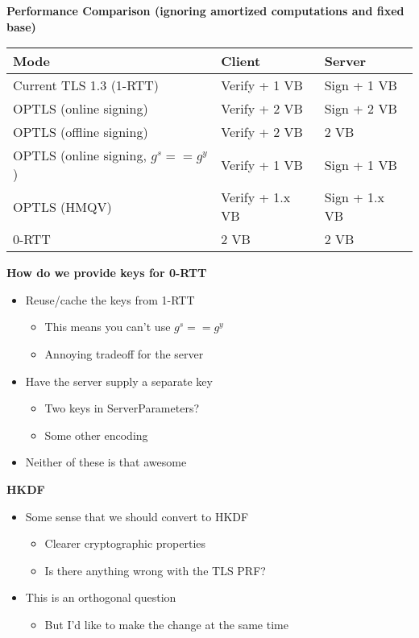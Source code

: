 \documentclass[helvetica]{seminar}
\newcommand{\heading}[1]{%
  \begin{center} 
    \large\bf 
    #1 
  \end{center} 
  \vspace{.4 in}}
\begin{document}
\begin{slide}
\heading{Performance Comparison (ignoring amortized computations and fixed base)}

\scriptsize{
\begin{tabular}{l l l}
Mode & Client & Server \\
\hline
Current TLS 1.3 (1-RTT) & Verify + 1 VB  & Sign + 1 VB  \\
OPTLS (online signing) & Verify + 2 VB  & Sign + 2 VB  \\
OPTLS (offline signing) & Verify + 2 VB  & 2 VB  \\
OPTLS (online signing, $g^s == g^y$) & Verify + 1 VB  & Sign + 1 VB  \\
OPTLS (HMQV) & Verify + 1.x VB  & Sign + 1.x VB  \\
0-RTT & 2 VB  & 2 VB  \\
\end{tabular}
}
\end{slide}


\begin{slide}
\heading{How do we provide keys for 0-RTT}

\begin{itemize}
\item Reuse/cache the keys from 1-RTT
  \begin{itemize}
  \item This means you can't use $g^s == g^y$
  \item Annoying tradeoff for the server
  \end{itemize}

\item Have the server supply a separate key
  \begin{itemize}
  \item Two keys in ServerParameters?
  \item Some other encoding
  \end{itemize}

\item Neither of these is that awesome
\end{itemize}
\end{slide}


\begin{slide}
\heading{HKDF}

\begin{itemize}
\item Some sense that we should convert to HKDF
  \begin{itemize}
  \item Clearer cryptographic properties
  \item Is there anything wrong with the TLS PRF?
  \end{itemize}

\item This is an orthogonal question
  \begin{itemize}
  \item But I'd like to make the change at the same time
  \end{itemize}
\end{itemize}
\end{slide}
\end{document}
